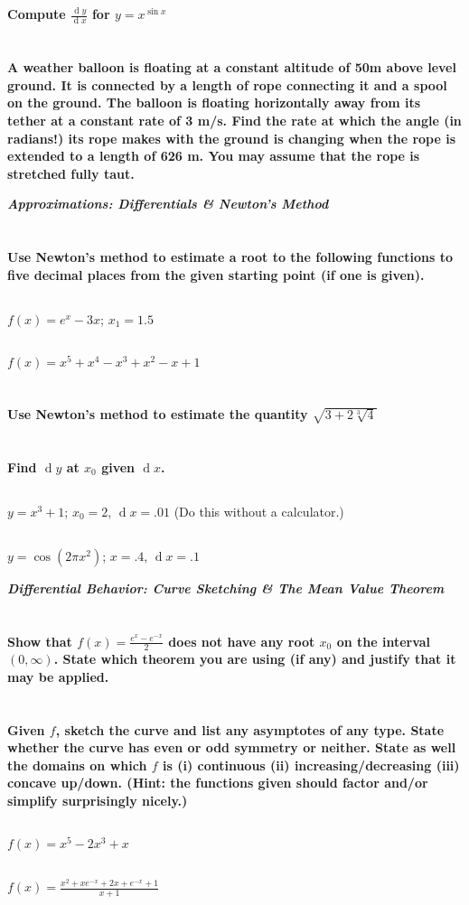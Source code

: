 \documentclass[english]{article}
\renewcommand{\d}[1]{\ensuremath{\operatorname{d}\!{#1}}}
\newcommand{\dydx}[2]{\frac{\d #1}{\d #2}}
\newcommand{\prob}[1]{\setcounter{section}{#1-1}\section{}}
\newcommand{\prt}[1]{\setcounter{subsection}{#1-1}\subsection{}}
\theoremstyle{remark}
\theoremstyle{definition}
\newcommand{\ild}[1]{\displaystyle{#1}}
\begin{document}
	\prob{3}
\textbf{Compute $\dydx{y}{x}$ for $y=x^{\sin{x}}$}
\newpage
\prob{4} \textbf{A weather balloon is floating at a constant altitude of 50m above level ground. It is connected by a length of rope connecting it and a spool on the ground. The balloon is floating horizontally away from its tether at a constant rate of 3 m/s. Find the rate at which the angle (in radians!) its rope makes with the ground is changing when the rope is extended to a length of 626 m. You may assume that the rope is stretched fully taut.}
\vspace{8cm}	
		\begin{center}{\Large\textbf{\emph{Approximations: Differentials \& Newton's Method}}}\end{center}
		\prob{5} \textbf{Use Newton's method to estimate a root to the following functions to five decimal places from the given starting point (if one is given).}
		\prt{1} $f(x)=e^x-3x$; $x_1=1.5$\vspace{3.5cm}
		\prt{2} $f(x)=x^5+x^4-x^3+x^2-x+1$
		\newpage
		\prob{6} \textbf{Use Newton's method to estimate the quantity $\sqrt{3+2\sqrt[3]{4}}$}\vspace{4cm}
		\prob{7} \textbf{Find $\d y$ at $x_0$ given $\d x$.}
		\prt{1} $y=x^3+1$; $x_0=2$, $\d x=.01$ (Do this without a calculator.)\vspace{3.5cm}
		\prt{2} $y=\cos{(2\pi x^2)}$; $x=.4$, $\d x=.1$\vspace{3.5cm}
		\begin{center}
			{\Large\textbf{\emph{Differential Behavior: Curve Sketching \& The Mean Value Theorem}}}\end{center}
			\prob{8} \textbf{Show that $f(x)=\frac{e^x-e^{-x}}{2}$ does not have any root $x_0$ on the interval $(0,\infty)$. State which theorem you are using (if any) and justify that it may be applied.}\newpage
			\prob{9}\textbf{Given $f$, sketch the curve and list any asymptotes of any type. State whether the curve has even or odd symmetry or neither. State as well the domains on which $f$ is (i) continuous (ii) increasing/decreasing (iii) concave up/down. (Hint: the functions given should factor and/or simplify surprisingly nicely.)}\prt{1}
			$\ild{f(x)=x^5-2x^3+x}$ \vspace{10cm}
			\prt{2} $\ild{f(x)=\frac{x^2+xe^{-x}+2x+e^{-x}+1}{x+1}}$\newpage
			
\end{document}

